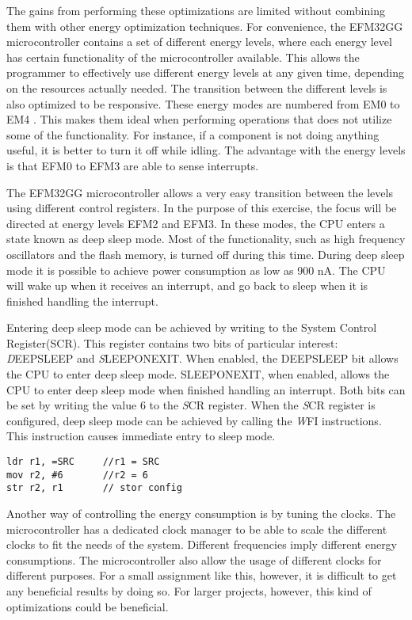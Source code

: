The gains from performing these optimizations are limited without combining them with other energy optimization techniques. For convenience, the EFM32GG microcontroller contains a set of different energy levels, where each energy level has certain functionality of the microcontroller available. This allows the programmer to effectively use different energy levels at any given time, depending on the resources actually needed. The transition between the different levels is also optimized to be responsive.  These energy modes are numbered from EM0 to EM4 \cite{EFM32GG-energy}. This makes them ideal when performing operations that does not utilize some of the functionality. For instance, if a component is not doing anything useful, it is better to turn it off while idling. The advantage with the energy levels is that EFM0 to EFM3 are able to sense interrupts.   

The EFM32GG microcontroller allows a very easy transition between the levels using different control registers. In the purpose of this exercise, the focus will be directed at energy levels EFM2 and EFM3. In these modes, the CPU enters a state known as deep sleep mode. Most of the functionality, such as high frequency oscillators and the flash memory, is turned off during this time. During deep sleep mode it is possible to achieve power consumption as low as 900 nA. The CPU will wake up when it receives an interrupt, and go back to sleep when it is finished handling the interrupt.

Entering deep sleep mode can be achieved by writing to the System Control Register(SCR). This register contains two bits of particular interest: \emph DEEPSLEEP and \emph SLEEPONEXIT. When enabled, the DEEPSLEEP bit allows the CPU to enter deep sleep mode. SLEEPONEXIT, when enabled, allows the CPU to enter deep sleep mode when finished handling an interrupt. Both bits can be set by writing the value 6 to the \emph SCR register. When the \emph SCR register is configured, deep sleep mode can be achieved by calling the \emph WFI instructions. This instruction causes immediate entry to sleep mode. 

\begin{lstlisting}
ldr r1, =SRC     //r1 = SRC
mov r2, #6       //r2 = 6         
str r2, r1       // stor config  
\end{lstlisting}

     

Another way of controlling the energy consumption is by tuning the clocks. The microcontroller has a dedicated clock manager to be able to scale the different clocks to fit the needs of the system. Different frequencies imply different energy consumptions. The microcontroller also allow the usage of different clocks for different purposes. For a small assignment like this, however, it is difficult to get any beneficial results by doing so. For larger projects, however, this kind of optimizations could be beneficial.

